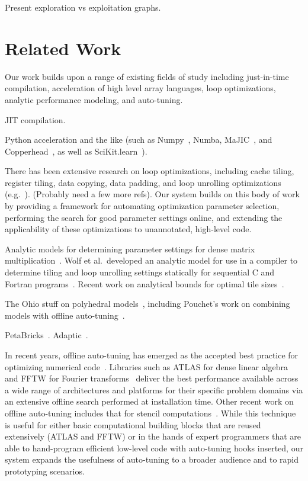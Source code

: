 \documentclass[preprint,9pt]{sigplanconf}
\begin{document}
Present exploration vs exploitation graphs.

\section{Related Work}
\label{related_work}
Our work builds upon a range of existing fields of study including just-in-time compilation, acceleration of high level array languages, loop optimizations, analytic performance modeling, and auto-tuning.

JIT compilation.

Python acceleration and the like (such as Numpy~\cite{Dubo96}, Numba, MaJIC~\cite{Alma02}, and Copperhead~\cite{Cata11}, as well as SciKit.learn~\cite{Pedr11}).

There has been extensive research on loop optimizations, including cache tiling, register tiling, data copying, data padding, and loop unrolling optimizations (e.g.~\cite{Lam91, Wolf91}). (Probably need a few more refs).  Our system builds on this body of work by providing a framework for automating optimization parameter selection, performing the search for good parameter settings online, and extending the applicability of these optimizations to unannotated, high-level code.

Analytic models for determining parameter settings for dense matrix multiplication~\cite{Cole95, Yoto03, Yoto05}.  Wolf et al.~developed an analytic model for use in a compiler to determine tiling and loop unrolling settings statically for sequential C and Fortran programs~\cite{Wolf96}.  Recent work on analytical bounds for optimal tile sizes~\cite{Shir12}.

The Ohio stuff on polyhedral models~\cite{Bond08}, including Pouchet's work on combining models with offline auto-tuning~\cite{Pouc10}.

PetaBricks~\cite{Anse09}.  Adaptic~\cite{Sama12}.

In recent years, offline auto-tuning has emerged as the accepted best practice for optimizing numerical code~\cite{Asan06}.  Libraries such as ATLAS for dense linear algebra~\cite{Whal00} and FFTW for Fourier transforms~\cite{Frig05} deliver the best performance available across a wide range of architectures and platforms for their specific problem domains via an extensive offline search performed at installation time.  Other recent work on offline auto-tuning includes that for stencil computations~\cite{Kami10,Datt08}.  While this technique is useful for either basic computational building blocks that are reused extensively (ATLAS and FFTW) or in the hands of expert programmers that are able to hand-program efficient low-level code with auto-tuning hooks inserted, our system expands the usefulness of auto-tuning to a broader audience and to rapid prototyping scenarios.
\end{document}
